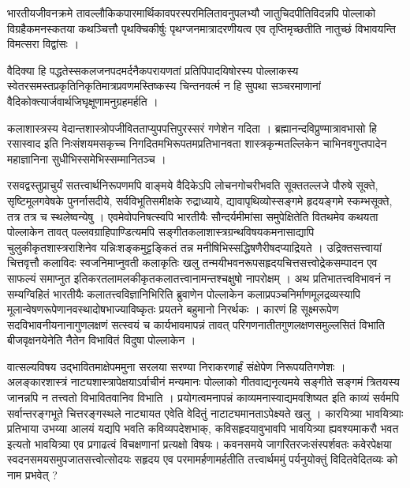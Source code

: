 {\dev भारतीयजीवनक्रमे तावल्लौकिकपारमार्थिकावपरस्परमिलितावनुपलभ्यौ जातुचिदपीति\break विदन्नपि पोल्लाको विग्रहैकमनस्कतया कथञ्चित्तौ पृथक्चिकीर्षुः पृथग्जनमात्रादरणीयत्व एव तृप्तिमृच्छतीति नातुच्छं विभावयन्ति विमत्सरा विद्वांसः ।}

{\dev वैदिक्या हि पद्धतेस्सकलजनपदमर्दनैकपरायणतां प्रतिपिपादयिषोरस्य पोल्लाकस्य स्वेतरसमस्तप्रकृतिनिकृतिमात्रप्रवणमस्तिष्कस्य चिन्तनवर्त्म न हि सुपथा सञ्चरमाणानां वैदिकोक्त्यार्जवार्थजिघृक्षूणामनुग्रहमर्हति ।}

{\dev कलाशास्त्रस्य वेदान्तशास्त्रोपजीवितताप्युपपत्तिपुरस्सरं गणेशेन गदिता । ब्रह्मानन्दविप्रुण्मा\-त्रावभासो हि रसास्वाद इति निःसंशयमसकृच्च निगदितमभिरूपतमप्रतिभानवता शास्त्रकृन्मत\-ल्लिकेन चाभिनवगुप्तपादेन महाज्ञानिना सुधीभिस्समेभिस्सम्मानितञ्च ।}

{\dev रसवद्वस्तुप्राचुर्यं सतत्त्वार्थनिरूपणमपि वाङ्मये वैदिकेऽपि लोचनगोचरीभवति सूक्ततल्लजे पौरुषे सूक्ते, सृष्टिमूलगवेषके पुनर्नासदीये, सर्वविभूतिसमीक्षके रुद्राध्याये, द्यावापृथिव्योस्स\-ङ्गमे हृदयङ्गमे स्कम्भसूक्ते, तत्र तत्र च स्थलेष्वन्येषु । एवमेवोपनिषत्स्वपि भारतीयैः सौन्दर्य\-मीमांसा समुपेक्षितेति वितथमेव कथयता पोल्लाकेन तावत् पल्लवग्राहिपाण्डित्यमपि  सङ्गीतकलाशास्त्रग्रन्थविषयकमनासाद्यापि चुलुकीकृतशास्त्रराशिनेव यन्निःशङ्कमुट्टङ्कितं तन्न मनीषिभिस्सद्धिषणैरीषदप्याद्रियते । उद्रिक्तसत्त्वायां चित्तवृत्तौ कलाविदः स्वजनिमाप्नुवती कलाकृतिः खलु तन्मयीभवनरूपसहृदयचित्तसत्त्वोद्रेकसम्पादन एव साफल्यं समाप्नुत इति\break करतलामलकीकृतकलातत्त्वानामन्तश्चक्षुषो नापरोक्षम् । अथ प्रतिभातत्त्वविभावनं न सम्य\-ग्विहितं भारतीयैः कलातत्त्वविज्ञानिभिरिति ब्रुवाणेन पोल्लाकेन कलाप्रपञ्चनिर्माणमूलद्रव्य\-स्यापि मूलान्वेषणरूपेणानवस्थादोषभाज्याविष्कृतः प्रयतने बहुमानो निरर्थकः । कारणं हि सूक्ष्मरूपेण सदविभावनीयनानागुणलक्षणं सत्स्वयं च कार्यभावमापन्नं तावत् परिगणनातीत\-गुणलक्षणसमुल्लसितं विभाति बीजवृक्षनयेनेति नैतेन विभावितं विदुषा पोल्लाकेन ।}

{\dev वात्सल्यविषय उद्भावितमाक्षेपममुना सरलया सरण्या निराकरणार्हं संक्षेपेण निरूपयति\break गणेशः । अलङ्कारशास्त्रं नाट्यशास्त्रापेक्षयाऽर्वाचीनं मन्यमानः पोल्लाको गीतवाद्यनृत्यमये सङ्गीते सङ्गमं त्रितयस्य जानन्नपि न तत्त्वतो विभावितवानिव विभाति । प्रयोगत्वमनापन्नं काव्यमनास्वाद्यमव\-शिष्यत इति काव्यं सर्वमपि सर्वान्तरङ्गभूते चित्तरङ्गस्थले नाट्यायत एवेति वेदितुं नाटाट्यमानताऽपेक्ष्यते खलु । कारयित्र्या भावयित्र्याः प्रतिभाया उभय्या आलयं यद्यपि भवति कविव्यपदेशभाक्, कविसहृदयावुभावपि भावयित्र्या ह्यवश्यमाकरौ भवत इत्यतो भावयित्र्या एव प्रगाढत्वं विचक्षणानां प्रत्यक्षो विषयः। कवनसमये जागरितरजःसंस्पर्शवतः कवेरपेक्षया स्वदनसमयसमुपजातसत्त्वोत्सोदयः सहृदय एव परमामर्हणामर्हतीति तत्त्वार्थममुं पर्यनुयोक्तुं विदितवेदितव्यः को नाम प्रभवेत् ?}

